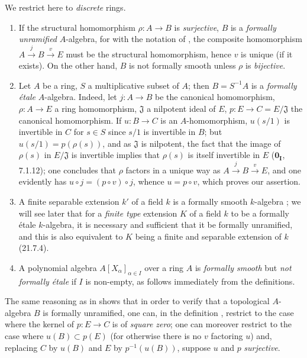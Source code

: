 \begin{examples}[19.10.3]
\label{0.19.10.3}
We restrict here to \emph{discrete} rings.
\begin{enumerate}
  \item[\rm(i)] If the structural homomorphism $\rho:A\to B$ is \emph{surjective}, $B$ is a \emph{formally unramified} $A$-algebra, for with the notation of , the composite homomorphism $A\xrightarrow{j}B\xrightarrow{v}E$ must be the structural homomorphism, hence $v$ is unique (if it exists).
On the other hand, $B$ is not formally smooth unless $\rho$ is \emph{bijective}.
  \item[\rm(ii)] Let $A$ be a ring, $S$ a multiplicative subset of $A$; then $B=S^{-1}A$ is a \emph{formally \'{e}tale} $A$-algebra.
Indeed, let $j:A\to B$ be the canonical homomorphism, $\rho:A\to E$ a ring homomorphism, $\mathfrak{J}$ a nilpotent ideal of $E$, $p:E\to C=E/\mathfrak{J}$ the canonical homomorphism.
If $u:B\to C$ is an $A$-homomorphism, $u(s/1)$ is invertible in $C$ for $s\in S$ since $s/1$ is invertible in $B$; but $u(s/1)=p(\rho(s))$, and as $\mathfrak{J}$ is nilpotent, the fact that the image of $\rho(s)$ in $E/\mathfrak{J}$ is invertible implies that $\rho(s)$ is itself invertible in $E$ ($\mathbf{0_I}$, 7.1.12); one concludes that $\rho$ factors in a unique way as $A\xrightarrow{j}B\xrightarrow{v}E$, and one evidently has $u\circ j=(p\circ v)\circ j$, whence $u=p\circ v$, which proves our assertion.
  \item[\rm(iii)] A finite separable extension $k'$ of a field $k$ is a formally smooth $k$-algebra ; we will see later that for a \emph{finite type} extension $K$ of a field $k$ to be a formally \'{e}tale $k$-algebra, it is necessary and sufficient that it be formally unramified, and this is also equivalent to $K$ being a finite and separable extension of $k$ (21.7.4).
  \item[\rm(iv)] A polynomial algebra $A[X_\alpha]_{\alpha\in I}$ over a ring $A$ is \emph{formally smooth}  but \emph{not formally \'{e}tale} if $I$ is non-empty, as follows immediately from the definitions.
\end{enumerate}
\end{examples}

\begin{remark}[19.10.4]
\label{0.19.10.4}
The same reasoning as in  shows that in order to verify that a topological $A$-algebra $B$ is formally unramified, one can, in the definition , restrict to the case where the kernel of $p:E\to C$ is of \emph{square zero}; one can moreover restrict to the case where $u(B)\subset p(E)$ (for otherwise there is no $v$ factoring $u$) and, replacing $C$ by $u(B)$ and $E$ by $p^{-1}(u(B))$, suppose $u$ and $p$ \emph{surjective}.
\end{remark}
